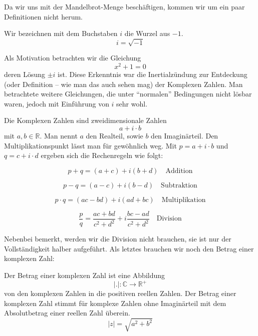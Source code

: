 Da wir uns mit der Mandelbrot-Menge beschäftigen, kommen wir um ein paar Definitionen nicht herum. 

\begin{definition}
Wir bezeichnen mit dem Buchstaben $i$ die Wurzel aus $-1$. 
\begin{equation}
i = \sqrt{-1}
\end{equation}
\end{definition}
Als Motivation betrachten wir die Gleichung
\begin{equation}
x^2 +1=0
\end{equation}
deren Lösung $\pm i$ ist. Diese Erkenntnis war die Inertialzündung zur Entdeckung (oder Definition -- wie man das auch sehen mag) der Komplexen Zahlen. Man betrachtete weitere Gleichungen, die unter "`normalen"' Bedingungen nicht lösbar waren, jedoch mit Einführung von $i$ sehr wohl.

\begin{definition}
Die Komplexen Zahlen sind zweidimensionale Zahlen
\begin{equation}\label{eq:komplex}
a+i\cdot b
\end{equation}
mit $a,b\in \mathbb{R}$. Man nennt $a$ den Realteil, sowie $b$ den Imaginärteil. Den Multiplikationspunkt lässt man für gewöhnlich weg.  Mit $p=a+i\cdot b$ und $q=c+i\cdot d$ ergeben sich die Rechenregeln wie folgt:
\end{definition}

\begin{equation}\label{eq:cmlxadd}
p+q = (a+c)+i(b+d)\quad \text{Addition}
\end{equation}

\begin{equation}\label{eq:cmlxsub}
p-q = (a-c)+i(b-d) \quad \text{Subtraktion}
\end{equation}

\begin{equation}\label{eq:cmlxmul}
p\cdot q = (ac-bd)+i(ad+bc) \quad \text{Multiplikation}
\end{equation}

\begin{equation}\label{eq:cmlxdiv}
\frac{p}{q} = \frac{ac+bd}{c^2+d^2} + i\frac{bc-ad}{c^2+d^2}\quad \text{Division}
\end{equation}

\noindent Nebenbei bemerkt, werden wir die Division nicht brauchen, sie ist nur der Vollständigkeit halber aufgeführt. Als letztes brauchen wir noch den Betrag einer komplexen Zahl:
\begin{definition}
Der Betrag einer komplexen Zahl ist eine Abbildung 
\begin{equation}
\vert . \vert : \mathbb{C} \longrightarrow \mathbb{R}^+
\end{equation}
von den komplexen Zahlen in die positiven reellen Zahlen. Der Betrag einer komplexen Zahl stimmt für komplexe Zahlen ohne Imaginärteil mit dem Absolutbetrag einer reellen Zahl überein.
\begin{equation}
\vert z \vert = \sqrt{a^2+b^2}
\end{equation}
\end{definition}

